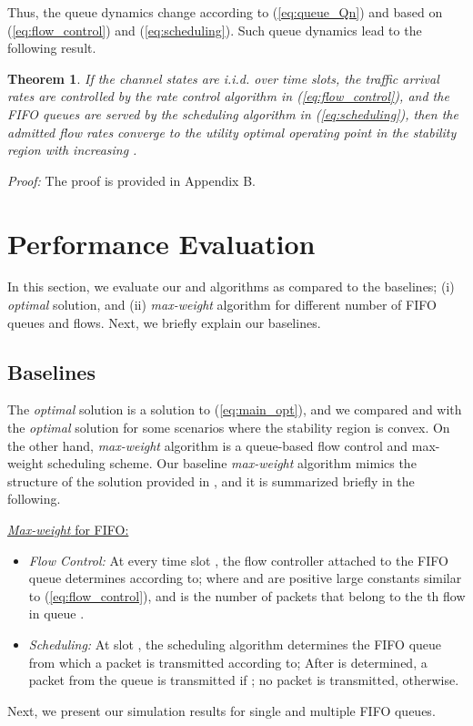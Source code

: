 \documentclass[conference]{IEEEtran}
\newtheorem{theorem}{Theorem}
\begin{document}
Thus, the queue dynamics change according to (\ref{eq:queue_Qn}) and based on (\ref{eq:flow_control}) and (\ref{eq:scheduling}). Such queue dynamics lead to the following result. 
\begin{theorem} \label{theorem_lyap}
If the channel states are i.i.d. over time slots, the traffic arrival rates are controlled by the rate control algorithm in (\ref{eq:flow_control}), and the FIFO queues are served by the scheduling algorithm in (\ref{eq:scheduling}), then the admitted flow rates converge to the utility optimal operating point in the stability region  with increasing .
\end{theorem}
{\em Proof:} The proof is provided in Appendix B.
\hfill 



\section{Performance Evaluation}\label{sec:performance}
In this section, we evaluate our  and  algorithms as compared to the baselines; (i) {\em optimal} solution, and (ii) {\em max-weight} algorithm for different number of FIFO queues and flows. Next, we briefly explain our baselines. 

\subsection{Baselines}
The {\em optimal} solution is a solution to (\ref{eq:main_opt}), and we compared  and  with the {\em optimal} solution for some scenarios where the stability region  is convex. On the other hand, {\em max-weight} algorithm is a queue-based flow control and max-weight scheduling scheme. Our baseline {\em max-weight} algorithm mimics the structure of the solution provided in \cite{neely_mod}, and it is summarized briefly in the following. 

\underline{{\em Max-weight} for FIFO:}
\begin{itemize} 
\item {\em Flow Control:} At every time slot , the flow controller attached to the FIFO queue  determines  according to;
 where  and  are positive large constants similar to (\ref{eq:flow_control}), and  is the number of packets that belong to the th flow in queue . 
\item {\em Scheduling:} At slot , the scheduling algorithm determines the FIFO queue from which a packet is transmitted according to; 
 After     is determined, a packet from the queue  is transmitted if      ; no packet is transmitted, otherwise. 
\end{itemize}
Next, we present our simulation results for single and multiple FIFO queues. 
\end{document}
